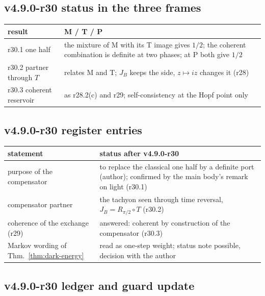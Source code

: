 \subsection*{v4.9.0-r30 status in the three frames}
\label{subsec:v490-r30-frames}

\begin{center}
\small
\begin{tabular}{@{}>{\raggedright\arraybackslash}p{}>{\raggedright\arraybackslash}p{}@{}}
\toprule
result & M / T / P\\
\midrule
r30.1 one half & the mixture of M with its T image gives \(1/2\); the coherent combination is definite at two phases; at P both give \(1/2\)\\
r30.2 partner through \(T\) & relates M and T; \(J_B\) keeps the side, \(z\mapsto iz\) changes it (r28)\\
r30.3 coherent reservoir & as r28.2(c) and r29; self-consistency at the Hopf point only\\
\bottomrule
\end{tabular}
\end{center}

\subsection*{v4.9.0-r30 register entries}
\label{subsec:v490-r30-register}

\begin{center}
\small
\begin{tabular}{@{}>{\raggedright\arraybackslash}p{}>{\raggedright\arraybackslash}p{}@{}}
\toprule
statement & status after v4.9.0-r30\\
\midrule
purpose of the compensator & to replace the classical one half by a definite port (author); confirmed by the main body's remark on light (r30.1)\\
compensator partner & the tachyon seen through time reversal, \(J_B=R_{\pi/2}\circ T\) (r30.2)\\
coherence of the exchange (r29) & answered: coherent by construction of the compensator (r30.3)\\
Markov wording of Thm.~\ref{thm:dark-energy} & read as one-step weight; status note possible, decision with the author\\
\bottomrule
\end{tabular}
\end{center}

\subsection*{v4.9.0-r30 ledger and guard update}
\label{subsec:v490-r30-ledger-guard}

